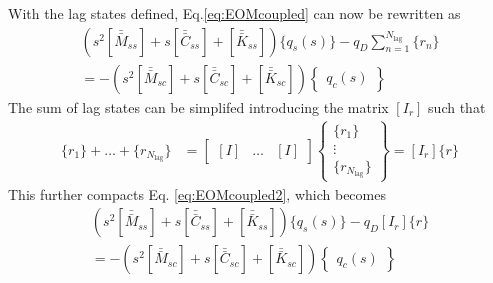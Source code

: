 With the lag states defined, Eq.\ref{eq:EOMcoupled} can now be rewritten as
\begin{multline}
	\label{eq:EOMcoupled2}
	\left( s^2 \left[\bar{\bar{M}}_{ss}\right] + s \left[\bar{\bar{C}}_{ss}\right] + \left[\bar{\bar{K}}_{ss}\right] \right) \{ q_s(s)\}
	- q_D \sum_{n=1}^{N_\text{lag}} \{r_n\}
	\\
	= - \left( s^2 \left[\bar{\bar{M}}_{sc}\right] + s \left[\bar{\bar{C}}_{sc}\right] + \left[\bar{\bar{K}}_{sc}\right] \right) \begin{Bmatrix} q_c(s) \end{Bmatrix}
\end{multline}
The sum of lag states can be simplifed introducing the matrix $[I_r]$ such that
\begin{align}
	\{r_1\} + \dots + \{r_{N_\text{lag}}\}
	&= \begin{bmatrix} [I] & \dots & [I] \end{bmatrix} \begin{Bmatrix} \{r_1\} \\ \vdots \\ \{r_{N_\text{lag}}\} \end{Bmatrix} = [I_r] \{r\}
\end{align}
This further compacts Eq. \ref{eq:EOMcoupled2}, which becomes
\begin{multline}
	\label{eq:EOMcoupled3}
	\left( s^2 \left[\bar{\bar{M}}_{ss}\right] + s \left[\bar{\bar{C}}_{ss}\right] + \left[\bar{\bar{K}}_{ss}\right] \right) \{ q_s(s)\}
	- q_D [I_r] \{r\}
	\\
	= - \left( s^2 \left[\bar{\bar{M}}_{sc}\right] + s \left[\bar{\bar{C}}_{sc}\right] + \left[\bar{\bar{K}}_{sc}\right] \right) \begin{Bmatrix} q_c(s) \end{Bmatrix}
\end{multline}

